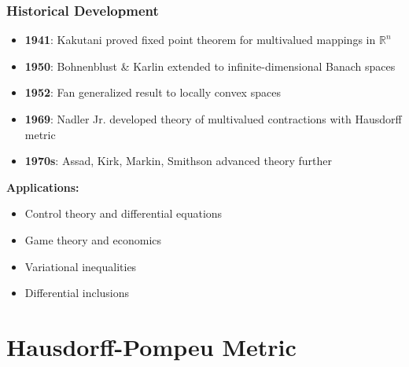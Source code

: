 \documentclass[aspectratio=169,10pt]{beamer}
\begin{document}
\begin{frame}
\frametitle{Historical Development}

\begin{itemize}
    \item \textbf{1941}: Kakutani proved fixed point theorem for multivalued mappings in $\mathbb{R}^n$

    \item \textbf{1950}: Bohnenblust \& Karlin extended to infinite-dimensional Banach spaces

    \item \textbf{1952}: Fan generalized result to locally convex spaces

    \item \textbf{1969}: Nadler Jr. developed theory of multivalued contractions with Hausdorff metric

    \item \textbf{1970s}: Assad, Kirk, Markin, Smithson advanced theory further
\end{itemize}

\vspace{0.3cm}

\textbf{Applications:}
\begin{itemize}
    \item Control theory and differential equations
    \item Game theory and economics
    \item Variational inequalities
    \item Differential inclusions
\end{itemize}

\end{frame}


\section{Hausdorff-Pompeu Metric}
\end{document}
